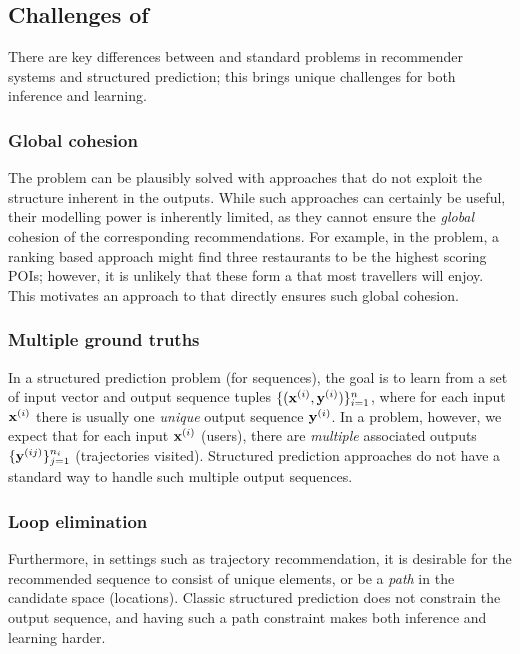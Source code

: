 \subsection{Challenges of {\seqrec}}

There are key differences between {\seqrec} and %
standard problems in recommender systems and structured prediction;
this brings unique challenges for both inference and learning.

%
\subsubsection{Global cohesion}
The {\seqrec} problem can be plausibly solved with approaches that do not exploit the structure inherent in the outputs. %
While such approaches can certainly be useful,
their modelling power is inherently limited,
as
they cannot ensure the \emph{global} cohesion of the corresponding recommendations. %
For example, in the {\trajrec} problem, a ranking based approach %
might find three restaurants to be the highest scoring POIs;
however, it is unlikely that these form a {\trajectory} that most travellers will enjoy.
This motivates an approach to {\seqrec} that directly ensures such global cohesion.


%
\subsubsection{Multiple ground truths}
In a structured prediction problem (for sequences), the goal is to learn from a set of
input vector and output sequence tuples
$\{ (\mathbf{x}^{({i})}, \mathbf{y}^{({i})}) \}_{i = 1}^n$, where
for each input $\mathbf{x}^{({i})}$ there is usually one \emph{unique} output sequence $\mathbf{y}^{({i})}$.
In a {\seqrec} problem, however, we expect that %
for each input $\mathbf{x}^{({i})}$ (\eg users),
there are \emph{multiple} associated outputs
$\{ \mathbf{y}^{({ij})} \}_{j=1}^{n_i}$ (\eg trajectories visited).
Structured prediction approaches do not have a standard way to handle such multiple output sequences.


%
\subsubsection{Loop elimination}
Furthermore, in settings such as trajectory recommendation, it is desirable for the recommended sequence to consist of unique elements,
or be a {\em path} in the candidate space (\eg locations).
Classic structured prediction does not constrain the output sequence, and having such a
path constraint makes both inference and learning harder. \\


